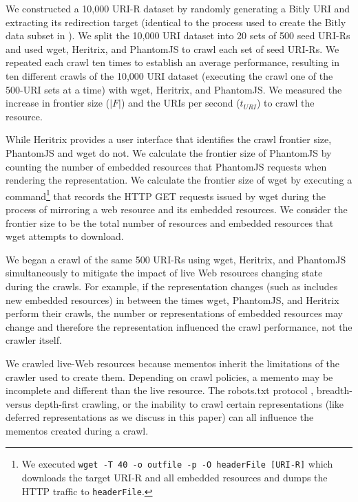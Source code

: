 \documentclass{ipres_proc_article-sp}
\begin{document}
We constructed a 10,000 URI-R dataset by randomly generating a Bitly URI and extracting its redirection target (identical to the process used to create the Bitly data subset in \cite{hmotwia}). We split the 10,000 URI dataset into 20 sets of 500 seed URI-Rs and used wget, Heritrix, and PhantomJS to crawl each set of seed URI-Rs. We repeated each crawl ten times to establish an average performance, resulting in ten different crawls of the 10,000 URI dataset (executing the crawl one of the 500-URI sets at a time) with wget, Heritrix, and PhantomJS. We measured the increase in frontier size ($|F|$) and the URIs per second ($t_{URI}$) to crawl the resource. 

While Heritrix provides a user interface that identifies the crawl frontier size, PhantomJS and wget do not. We calculate the frontier size of PhantomJS by counting the number of embedded resources that PhantomJS requests when rendering the representation. We calculate the frontier size of wget by executing a command\footnote{We executed \texttt{wget -T 40 -o outfile -p -O headerFile [URI-R]} which downloads the target URI-R and all embedded resources and dumps the HTTP traffic to \texttt{headerFile}.} that records the HTTP GET requests issued by wget during the process of mirroring a web resource and its embedded resources. We consider the frontier size to be the total number of resources and embedded resources that wget attempts to download.

We began a crawl of the same 500 URI-Rs using wget, Heritrix, and PhantomJS simultaneously to mitigate the impact of live Web resources changing state during the crawls. For example, if the representation changes (such as includes new embedded resources) in between the times wget, PhantomJS, and Heritrix perform their crawls, the number or representations of embedded resources may change and therefore the representation influenced the crawl performance, not the crawler itself. 

We crawled live-Web resources because mementos inherit the limitations of the crawler used to create them. Depending on crawl policies, a memento may be incomplete and different than the live resource. The robots.txt protocol \cite{robots, robotsProtocol}, breadth- versus depth-first crawling, or the inability to crawl certain representations (like deferred representations as we discuss in this paper) can all influence the mementos created during a crawl.
\end{document}
